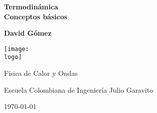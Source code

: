 \documentclass{article}
\newcommand{\logo}{"logo-eci.png"}
\newcommand{\titlename}{Termodinámica \\[10pt] Conceptos básicos}
\renewcommand{\author}{{David Gómez}}
\begin{document}
\begin{titlepage}
    \begin{center}
        \vspace{1cm}

        \textbf{\Huge{\titlename}}

        \vspace{1.5cm}

        \textbf{\large{\author}}

        \vspace{3cm}

        \texttt{[image: \\logo]}
        
        \vfill

        Física de Calor y Ondas

        Escuela Colombiana de Ingeniería Julio Garavito

        \today
    \end{center}
\end{titlepage}

\clearpage
\tableofcontents




\end{document}
